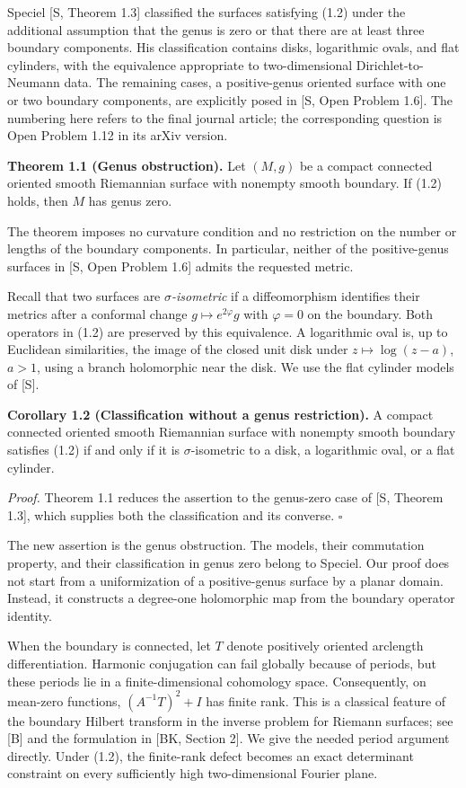 \documentclass[11pt]{article}
\begin{document}
Speciel {[}S, Theorem 1.3{]} classified the surfaces satisfying (1.2)
under the additional assumption that the genus is zero or that there are
at least three boundary components. His classification contains disks,
logarithmic ovals, and flat cylinders, with the equivalence appropriate
to two-dimensional Dirichlet-to-Neumann data. The remaining cases, a
positive-genus oriented surface with one or two boundary components, are
explicitly posed in {[}S, Open Problem 1.6{]}. The numbering here refers
to the final journal article; the corresponding question is Open Problem
1.12 in its arXiv version.

\textbf{Theorem 1.1 (Genus obstruction).} Let \((M,g)\) be a compact
connected oriented smooth Riemannian surface with nonempty smooth
boundary. If (1.2) holds, then \(M\) has genus zero.

The theorem imposes no curvature condition and no restriction on the
number or lengths of the boundary components. In particular, neither of
the positive-genus surfaces in {[}S, Open Problem 1.6{]} admits the
requested metric.

Recall that two surfaces are \emph{\(\sigma\)-isometric} if a
diffeomorphism identifies their metrics after a conformal change
\(g\mapsto e^{2\varphi}g\) with \(\varphi=0\) on the boundary. Both
operators in (1.2) are preserved by this equivalence. A logarithmic oval
is, up to Euclidean similarities, the image of the closed unit disk
under \(z\mapsto\log(z-a)\), \(a>1\), using a branch holomorphic near
the disk. We use the flat cylinder models of {[}S{]}.

\textbf{Corollary 1.2 (Classification without a genus restriction).} A
compact connected oriented smooth Riemannian surface with nonempty
smooth boundary satisfies (1.2) if and only if it is
\(\sigma\)-isometric to a disk, a logarithmic oval, or a flat cylinder.

\emph{Proof.} Theorem 1.1 reduces the assertion to the genus-zero case
of {[}S, Theorem 1.3{]}, which supplies both the classification and its
converse. \(\square\)

The new assertion is the genus obstruction. The models, their
commutation property, and their classification in genus zero belong to
Speciel. Our proof does not start from a uniformization of a
positive-genus surface by a planar domain. Instead, it constructs a
degree-one holomorphic map from the boundary operator identity.

When the boundary is connected, let \(T\) denote positively oriented
arclength differentiation. Harmonic conjugation can fail globally
because of periods, but these periods lie in a finite-dimensional
cohomology space. Consequently, on mean-zero functions,
\((A^{-1}T)^2+I\) has finite rank. This is a classical feature of the
boundary Hilbert transform in the inverse problem for Riemann surfaces;
see {[}B{]} and the formulation in {[}BK, Section 2{]}. We give the
needed period argument directly. Under (1.2), the finite-rank defect
becomes an exact determinant constraint on every sufficiently high
two-dimensional Fourier plane.
\end{document}
